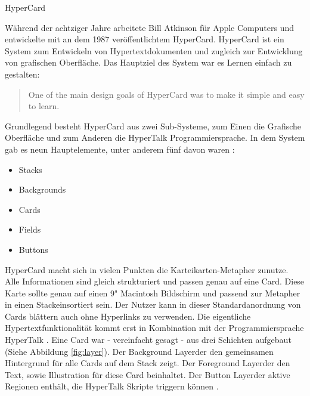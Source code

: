 \begin{section}{HyperCard}
\label{sec:hypercard}

Während der achtziger Jahre arbeitete Bill Atkinson für Apple Computers und entwickelte mit an dem 1987 veröffentlichtem \glqq HyperCard\grqq. HyperCard ist ein System zum Entwickeln von Hypertextdokumenten und zugleich zur Entwicklung von grafischen Oberfläche. Das Hauptziel des System war es \glqq Lernen einfach zu gestalten\grqq{ }\cite{Nielsen1991}:

\begin{quote}
\glqq One of the main design goals of HyperCard was to make it simple and easy to learn.\grqq \cite{Nielsen1991}
\end{quote}

Grundlegend besteht HyperCard aus zwei Sub-Systeme, zum Einen die Grafische Oberfläche und zum Anderen die HyperTalk Programmiersprache. In dem System gab es neun \glqq Hauptelemente\grqq, unter anderem fünf davon waren \cite{Goodman1988}:

\begin{itemize}
\item Stacks
\item Backgrounds
\item Cards
\item Fields
\item Buttons
\end{itemize}

HyperCard macht sich in vielen Punkten die Karteikarten-Metapher zunutze. Alle Informationen sind gleich strukturiert und passen genau auf eine \glqq Card\grqq. Diese Karte sollte genau auf einen 9" Macintosh Bildschirm und passend zur Metapher in einen \glqq Stack\grqq{ }einsortiert sein. Der Nutzer kann in dieser Standardanordnung von Cards blättern auch ohne Hyperlinks zu verwenden. Die eigentliche Hypertextfunktionalität kommt erst in Kombination mit der Programmiersprache \glqq HyperTalk\grqq{ }\cite{Goodman1988} \cite{Nielsen1991}. Eine Card war - vereinfacht gesagt - aus drei Schichten aufgebaut (Siehe Abbildung \ref{fig:layer}). Der \glqq Background Layer\grqq{ }der den gemeinsamen Hintergrund für alle Cards auf dem Stack zeigt. Der \glqq Foreground Layer\grqq{ }der den Text, sowie Illustration für diese Card beinhaltet. Der \glqq Button Layer\grqq{ }der aktive Regionen enthält, die HyperTalk Skripte triggern können \cite{Nielsen1995}.


\end{section}
